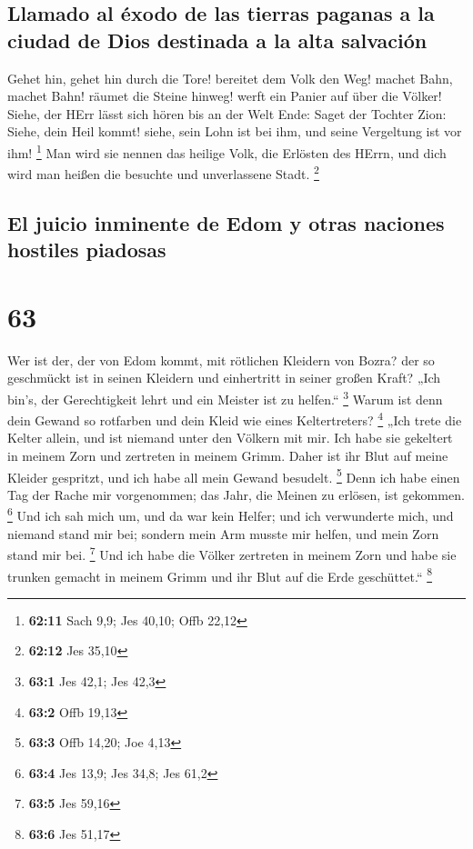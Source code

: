 \hypertarget{llamado-al-uxe9xodo-de-las-tierras-paganas-a-la-ciudad-de-dios-destinada-a-la-alta-salvaciuxf3n}{%
\subsection{Llamado al éxodo de las tierras paganas a la ciudad de Dios
destinada a la alta
salvación}\label{llamado-al-uxe9xodo-de-las-tierras-paganas-a-la-ciudad-de-dios-destinada-a-la-alta-salvaciuxf3n}}

 Gehet hin, gehet hin durch die Tore! bereitet dem Volk
den Weg! machet Bahn, machet Bahn! räumet die Steine hinweg! werft ein
Panier auf über die Völker!  Siehe, der HErr lässt sich
hören bis an der Welt Ende: Saget der Tochter Zion: Siehe, dein Heil
kommt! siehe, sein Lohn ist bei ihm, und seine Vergeltung ist vor ihm!
\footnote{\textbf{62:11} Sach 9,9; Jes 40,10; Offb 22,12}
 Man wird sie nennen das heilige Volk, die Erlösten des
HErrn, und dich wird man heißen die besuchte und unverlassene Stadt.
\footnote{\textbf{62:12} Jes 35,10}

\hypertarget{el-juicio-inminente-de-edom-y-otras-naciones-hostiles-piadosas}{%
\subsection{El juicio inminente de Edom y otras naciones hostiles
piadosas}\label{el-juicio-inminente-de-edom-y-otras-naciones-hostiles-piadosas}}

\hypertarget{section-62}{%
\section{63}\label{section-62}}

 Wer ist der, der von Edom kommt, mit rötlichen Kleidern
von Bozra? der so geschmückt ist in seinen Kleidern und einhertritt in
seiner großen Kraft? „Ich bin's, der Gerechtigkeit lehrt und ein Meister
ist zu helfen.`` \footnote{\textbf{63:1} Jes 42,1; Jes 42,3}
 Warum ist denn dein Gewand so rotfarben und dein Kleid
wie eines Keltertreters? \footnote{\textbf{63:2} Offb 19,13}
 „Ich trete die Kelter allein, und ist niemand unter den
Völkern mit mir. Ich habe sie gekeltert in meinem Zorn und zertreten in
meinem Grimm. Daher ist ihr Blut auf meine Kleider gespritzt, und ich
habe all mein Gewand besudelt. \footnote{\textbf{63:3} Offb 14,20; Joe
  4,13}  Denn ich habe einen Tag der Rache mir
vorgenommen; das Jahr, die Meinen zu erlösen, ist gekommen. \footnote{\textbf{63:4}
  Jes 13,9; Jes 34,8; Jes 61,2}  Und ich sah mich um, und
da war kein Helfer; und ich verwunderte mich, und niemand stand mir bei;
sondern mein Arm musste mir helfen, und mein Zorn stand mir bei.
\footnote{\textbf{63:5} Jes 59,16}  Und ich habe die
Völker zertreten in meinem Zorn und habe sie trunken gemacht in meinem
Grimm und ihr Blut auf die Erde geschüttet.`` \footnote{\textbf{63:6}
  Jes 51,17}

